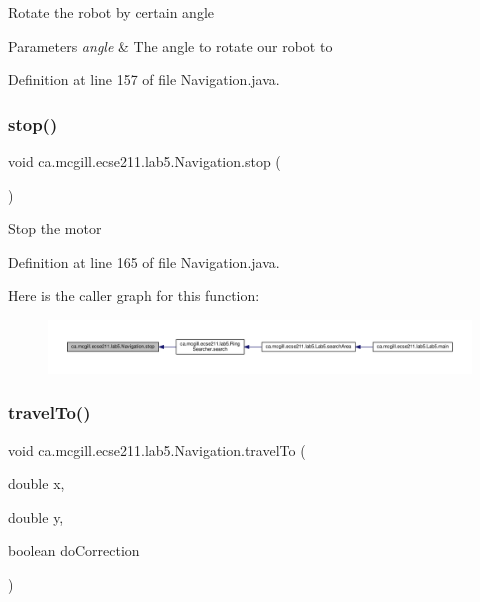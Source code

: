 Rotate the robot by certain angle


\begin{DoxyParams}{Parameters}
{\em angle} & The angle to rotate our robot to \\
\hline
\end{DoxyParams}


Definition at line 157 of file Navigation.\+java.

\mbox{\label{classca_1_1mcgill_1_1ecse211_1_1lab5_1_1_navigation_afe038af6692e7ad28c3587cd979d7223}} 
\subsubsection{\texorpdfstring{stop()}{stop()}}
{\footnotesize\ttfamily void ca.\+mcgill.\+ecse211.\+lab5.\+Navigation.\+stop (\begin{DoxyParamCaption}{ }\end{DoxyParamCaption})}

Stop the motor 

Definition at line 165 of file Navigation.\+java.

Here is the caller graph for this function\+:
\nopagebreak
\begin{figure}[H]
\begin{center}
\leavevmode
\includegraphics[width=350pt]{classca_1_1mcgill_1_1ecse211_1_1lab5_1_1_navigation_afe038af6692e7ad28c3587cd979d7223_icgraph}
\end{center}
\end{figure}
\mbox{\label{classca_1_1mcgill_1_1ecse211_1_1lab5_1_1_navigation_a318969f4776d0bf4a8721be3d2444a5c}} 
\subsubsection{\texorpdfstring{travel\+To()}{travelTo()}}
{\footnotesize\ttfamily void ca.\+mcgill.\+ecse211.\+lab5.\+Navigation.\+travel\+To (\begin{DoxyParamCaption}\item[{double}]{x,  }\item[{double}]{y,  }\item[{boolean}]{do\+Correction }\end{DoxyParamCaption})}

